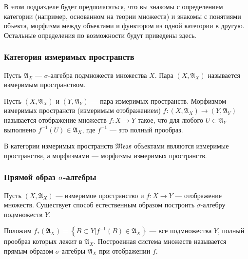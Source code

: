 \documentclass[12pt]{article}
\numberwithin{theorem}{section}
\theoremstyle{definition}
\newcommand{\defin}[2]{\hypertarget{#2}{{\color{red} #1}}}
\newcommand{\setsigmaalg}{\mathfrak{A}}
\newcommand{\Meas}{\mathfrak{Meas}}
\newcommand{\defineset}[2]{\left\{
	\left.
	#1
	\right\vert
	#2
	\right\}}
\begin{document}
	В этом подразделе будет предполагаться, что вы знакомы с определением категории 
	(например, основанном на теории множеств) и знакомы с понятиями объекта, морфизма между объектами и функтором из одной категории в другую. Остальные определения по возможности будут приведены здесь.
	
	\subsubsection{Категория измеримых пространств}
	
	Пусть $ \setsigmaalg_X $ --- $ \sigma $-алгебра подмножеств множества $ X $.
	Пара $ (X, \setsigmaalg_X) $ называется \defin{измеримым пространством}{measurable-space}.
	
	Пусть $ (X, \setsigmaalg_X) $ и $ (Y, \setsigmaalg_Y) $ --- пара измеримых пространств.
	\defin{Морфизмом измеримых пространств (измеримым отображением)}{morphism-of-measurable-spaces} 
	$ f \colon (X, \setsigmaalg_X) \to (Y, \setsigmaalg_Y) $ называется отображение
	множеств $ f \colon X \to Y $ такое, что для любого $ U \in \setsigmaalg_Y $ выполнено $ f^{-1}(U) \in \setsigmaalg_X $,
	где $ f^{-1} $ --- это полный прообраз.
	
	В категории измеримых пространств $ \Meas $ объектами являются измеримые пространства, а морфизмами
	--- морфизмы измеримых пространств.
	
	\subsubsection{Прямой образ $ \sigma $-алгебры}
	
	Пусть $ (X, \setsigmaalg_X) $ --- измеримое пространство и $ f \colon X \to Y $ --- отображение множеств.
	Существует способ естественным образом построить $ \sigma $-алгебру подмножеств $ Y $.
	
	Положим $ f_{*}(\setsigmaalg_X) = \defineset{B \subset Y}{f^{-1}(B) \in \setsigmaalg_X} $ --- все подмножества $ Y $,
	полный прообраз которых лежит в $ \setsigmaalg_X $. 
	Построенная система множеств называется \defin{прямым образом}{direct-image-of-sigma-algebra} 
	$ \sigma $-алгебры $ \setsigmaalg_X $ при отображении $ f $.
	
\end{document}
